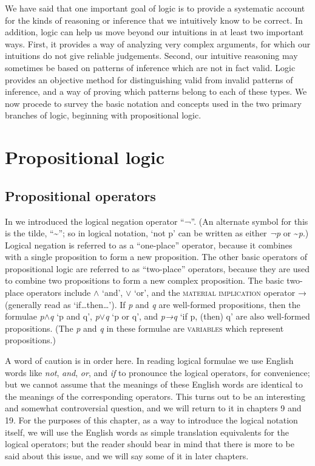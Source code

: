 We have said that one important goal of logic is to provide a systematic account for the kinds of reasoning or inference that we intuitively know to be correct. In addition, logic can help us move beyond our intuitions in at least two important ways. First, it provides a way of analyzing very complex arguments, for which our intuitions do not give reliable judgements. Second, our intuitive reasoning may sometimes be based on patterns of inference which are not in fact valid. Logic provides an objective method for distinguishing valid from invalid patterns of inference, and a way of proving which patterns belong to each of these types. We now procede to survey the basic notation and concepts used in the two primary branches of logic, beginning with propositional logic.


\section{Propositional logic}\label{sec:} %
\subsection{Propositional operators}\label{sec:} %

In  we introduced the logical negation operator “¬”. (An alternate symbol for this is the tilde, “{\textasciitilde}”; so in logical notation, ‘not p’ can be written as either \textit{¬p} or {\textasciitilde}\textit{p}.) Logical negation is referred to as a “one-place” operator, because it combines with a single proposition to form a new proposition. The other basic operators of propositional logic are referred to as “two-place” operators, because they are used to combine two propositions to form a new complex proposition. The basic two-place operators include $\wedge$ ‘and’, $\vee$ ‘or’, and the \textsc{material} \textsc{implication} operator → (generally read as ‘if…then…’). If \textit{p} and \textit{q} are well-formed propositions, then the formulae \textit{p$\wedge$}\textit{q} ‘p and q’, \textit{p$\vee$}\textit{q} ‘p or q’, and \textit{p→}\textit{q} ‘if p, (then) q’ are also well-formed propositions. (The \textit{p} and \textit{q} in these formulae are \textsc{variables} which represent propositions.)



A word of caution is in order here. In reading logical formulae we use English words like \textit{not}, \textit{and}, \textit{or}, and \textit{if} to pronounce the logical operators, for convenience; but we cannot assume that the meanings of these English words are identical to the meanings of the corresponding operators. This turns out to be an interesting and somewhat controversial question, and we will return to it in chapters 9 and 19. For the purposes of this chapter, as a way to introduce the logical notation itself, we will use the English words as simple translation equivalents for the logical operators; but the reader should bear in mind that there is more to be said about this issue, and we will say some of it in later chapters.



